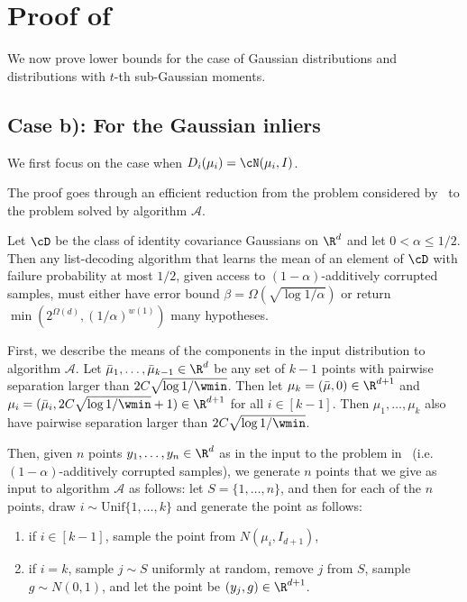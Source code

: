 \section{Proof of ~}
\label{app:lbs}

We now prove lower bounds for the case of Gaussian distributions and distributions with \(t\)-th sub-Gaussian moments.

\subsection{Case b): For the Gaussian inliers  }

We first focus on the case when \(D_i(\mu_i) = \cN(\mu_i, I)\).

The proof goes through an efficient reduction from the problem considered by~ to the problem solved by algorithm $\mathcal{A}$.
\begin{proposition}
\label{prop:book_lb_gaus}
    Let \(\cD\) be the class of identity covariance Gaussians on \(\R^d\) and let \(0 < \alpha \leq 1/2\). Then any list-decoding algorithm that learns the mean of an element of \(\cD\) with failure probability at most \(1/2\), given access to \((1 - \alpha)\)-additively corrupted samples, must either have error bound \(\beta = \Omega(\sqrt{\log 1 / \alpha})\) or return \(\min(2^{\Omega(d)}, (1/\alpha)^{w(1)})\) many hypotheses.
\end{proposition}


First, we describe the means of the components in the input distribution to algorithm $\mathcal{A}$.
Let $\bar\mu_1, \ldots, \bar\mu_{k-1} \in \R^{d}$ be any set of $k-1$ points with pairwise separation larger than $2C\sqrt{\log1/\wmin}$.
Then let $\mu_k = (\bar\mu, 0) \in \R^{d+1}$ and $\mu_i = (\bar\mu_i, 2C\sqrt{\log 1/\wmin} + 1) \in \R^{d+1}$ for all $i \in [k-1]$.
Then $\mu_1, \ldots, \mu_k$ also have pairwise separation larger than $2C\sqrt{\log 1/\wmin}$.

Then, given $n$ points $y_1, \ldots, y_n \in \R^d$ as in the input to the problem in~ (i.e. \((1-\alpha)\)-additively corrupted samples), we generate $n$ points that we give as input to algorithm $\mathcal{A}$ as follows: let $S = \{1, \ldots, n\}$, and then for each of the $n$ points, draw $i \sim \mathrm{Unif}\{1, \ldots, k\}$ and generate the point as follows:
\begin{enumerate}
    \item if $i \in [k-1]$, sample the point from $N(\mu_i, I_{d+1})$,
    \item if $i = k$, sample $j \sim S$ uniformly at random, remove $j$ from $S$, sample $g \sim N(0, 1)$, and let the point be $(y_j, g) \in \R^{d+1}$.
\end{enumerate}

